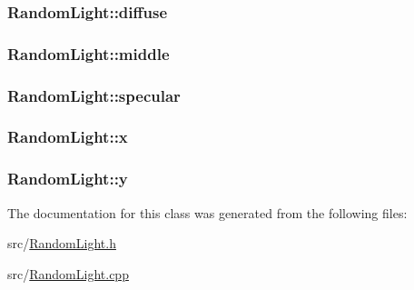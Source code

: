 \subsubsection[{\texorpdfstring{diffuse}{diffuse}}]{ Random\+Light\+::diffuse\hspace{0.3cm}{\ttfamily [private]}}\hypertarget{classRandomLight_a26ffb2886dbb56b24d77fd8c760c8b28}{}\label{classRandomLight_a26ffb2886dbb56b24d77fd8c760c8b28}
\subsubsection[{\texorpdfstring{middle}{middle}}]{ Random\+Light\+::middle\hspace{0.3cm}{\ttfamily [private]}}\hypertarget{classRandomLight_a13f0aa6e386b4eb09b786a81d2d9e9ff}{}\label{classRandomLight_a13f0aa6e386b4eb09b786a81d2d9e9ff}
\subsubsection[{\texorpdfstring{specular}{specular}}]{ Random\+Light\+::specular\hspace{0.3cm}{\ttfamily [private]}}\hypertarget{classRandomLight_ac8014c223873c92490dfb697cc4663d4}{}\label{classRandomLight_ac8014c223873c92490dfb697cc4663d4}
\subsubsection[{\texorpdfstring{x}{x}}]{ Random\+Light\+::x\hspace{0.3cm}{\ttfamily [private]}}\hypertarget{classRandomLight_a5582baaa81ff0117f66ef8f3636859ed}{}\label{classRandomLight_a5582baaa81ff0117f66ef8f3636859ed}
\subsubsection[{\texorpdfstring{y}{y}}]{ Random\+Light\+::y\hspace{0.3cm}{\ttfamily [private]}}\hypertarget{classRandomLight_a9d9e2fcde9c0d83b655f9a259d54a6d8}{}\label{classRandomLight_a9d9e2fcde9c0d83b655f9a259d54a6d8}


The documentation for this class was generated from the following files\+:\begin{DoxyCompactItemize}
\item 
src/\hyperlink{RandomLight_8h}{Random\+Light.\+h}\item 
src/\hyperlink{RandomLight_8cpp}{Random\+Light.\+cpp}\end{DoxyCompactItemize}
